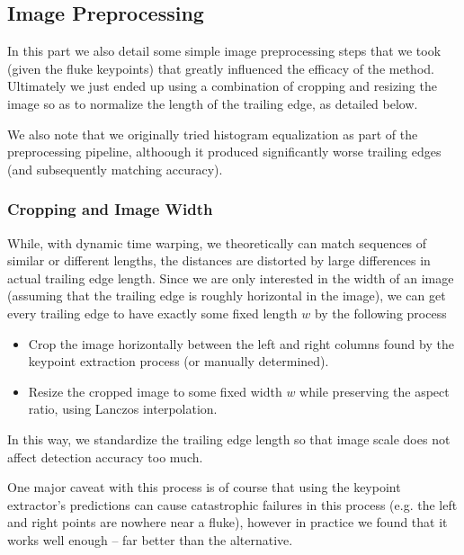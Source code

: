 
\subsection{Image Preprocessing}

In this part we also detail some simple image preprocessing steps that we took (given the fluke keypoints) that greatly influenced the efficacy of the method.
Ultimately we just ended up using a combination of cropping and resizing the image so as to normalize the length of the trailing edge, as detailed below.

We also note that we originally tried histogram equalization as part of the preprocessing pipeline, althoough it produced significantly worse trailing edges (and subsequently matching accuracy).

\subsubsection{Cropping and Image Width}

While, with dynamic time warping, we theoretically can match sequences of similar or different lengths, the distances are distorted by large differences in actual trailing edge length.
Since we are only interested in the width of an image (assuming that the trailing edge is roughly horizontal in the image), we can get every trailing edge to have exactly some fixed length $w$ by the following process

\begin{itemize}
    \item Crop the image horizontally between the left and right columns found by the keypoint extraction process (or manually determined).
    \item Resize the cropped image to some fixed width $w$ while preserving the aspect ratio, using Lanczos interpolation. %
\end{itemize}

In this way, we standardize the trailing edge length so that image scale does not affect detection accuracy too much.

One major caveat with this process is of course that using the keypoint extractor's predictions can cause catastrophic failures in this process (e.g. the left and right points are nowhere near a fluke), however in practice we found that it works well enough -- far better than the alternative.


